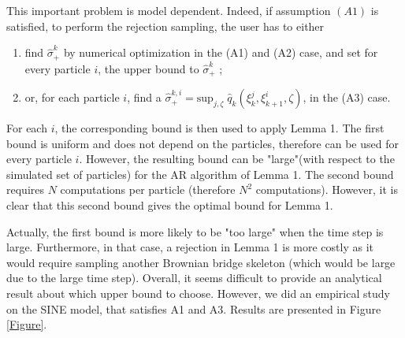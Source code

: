 \documentclass[12pt]{article}
\newcommand{\1}{\mathrm{1}}
\begin{document}
\begin{enumerate}
This important problem is model dependent. Indeed, if assumption $(A1)$ is satisfied, to perform the rejection sampling, the user has to either
\begin{enumerate}
\item find $\widehat{\sigma}_+^k$ by numerical optimization in the (A1) and (A2) case, and set for every particle $i$, the upper bound to $\widehat{\sigma}_+^k$ ;
\item or, for each particle $i$, find a $\widehat{\sigma}_+^{k, i } = \mathrm{sup}_{j,\zeta}\;\widehat{q}_k(\xi^j_k,\xi^i_{k+1},\zeta)$, in the (A3) case.
\end{enumerate}
For each $i$, the corresponding bound is then used to apply Lemma 1. The first bound is uniform and does not depend on the particles, therefore can be used for every particle $i$.  However, the resulting bound  can be "large"(with respect to the simulated set of particles) for the AR algorithm of Lemma 1.
The second bound requires $N$ computations per particle (therefore $N^2$ computations). However, it is clear that this second bound gives the optimal bound for Lemma 1.

Actually, the first bound is more likely to be "too large" when the time step is large. Furthermore, in that case, a rejection in Lemma 1 is more costly as it would require sampling another Brownian bridge skeleton (which would be large due to the large time step). Overall, it seems difficult to provide an analytical result about which upper bound to choose. However, we did an empirical study on the SINE model, that satisfies A1 and A3. Results are presented in Figure \ref{Figure}.


\end{enumerate}
\end{document}
